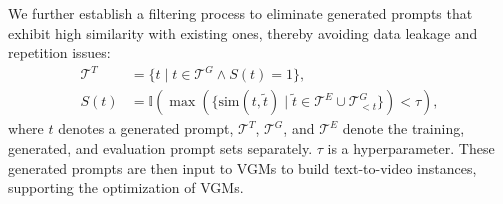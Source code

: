 We further establish a filtering process to eliminate generated prompts that exhibit high similarity with existing ones, thereby avoiding data leakage and repetition issues:
\begin{align}
\mathcal{T}^T &= \{t\;|\;t\in\mathcal{T}^G \land S(t)=1\}, \\
S(t)&= \mathbb{I}\left(\max\left(\{\mathrm{sim}\left(t,\tilde{t}\right)\;|\;\tilde{t}\in\mathcal{T}^E\cup\mathcal{T}^G_{<t} \}\right) < \tau\right), \nonumber
\end{align}
where $t$ denotes a generated prompt, $\mathcal{T}^T$, $\mathcal{T}^G$, and $\mathcal{T}^E$ denote the training, generated, and evaluation prompt sets separately. $\tau$ is a hyperparameter. These generated prompts are then input to VGMs to build text-to-video instances, supporting the optimization of VGMs.


